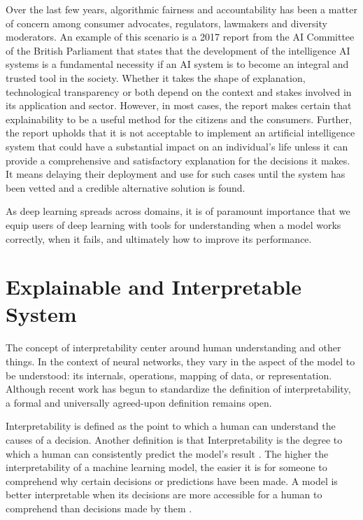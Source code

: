 Over the last few years, algorithmic fairness and accountability has been a matter of concern among consumer advocates, regulators, lawmakers and diversity moderators. An example of this scenario is a 2017 report from the AI Committee of the British Parliament \cite{Hagras2018} that states that the development of the intelligence AI systems is a fundamental necessity if an AI system is to become an integral and trusted tool in the society. Whether it takes the shape of explanation, technological transparency or both depend on the context and stakes involved in its application and sector. However, in most cases, the report makes certain that explainability to be a useful method for the citizens and the consumers. Further, the report upholds that it is not acceptable to implement an artificial intelligence system that could have a substantial impact on an individual's life unless it can provide a comprehensive and satisfactory explanation for the decisions it makes. It means delaying their deployment and use for such cases until the system has been vetted and a credible alternative solution is found.

As deep learning spreads across domains, it is of paramount importance that we equip users of deep learning with tools for understanding when a model works correctly, when it fails, and ultimately how to improve its performance.

\section{Explainable and Interpretable System}

The concept of interpretability center around human understanding and other things. In the context of neural networks, they vary in the aspect of the model to be understood: its internals, operations, mapping of data, or representation. Although recent work has begun to standardize the definition of interpretability, a formal and universally agreed-upon definition remains open.

Interpretability is defined as the point to which a human can understand the causes of a decision. Another definition is that Interpretability is the degree to which a human can consistently predict the model’s result \cite{molnar}. The higher the interpretability of a machine learning model, the easier it is for someone to comprehend why certain decisions or predictions have been made. A model is better interpretable when its decisions are more accessible for a human to comprehend than decisions made by them \cite{molnar}.
    
